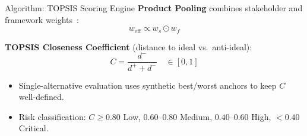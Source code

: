 
\begin{frame}{Algorithm: TOPSIS Scoring Engine}
    \textbf{Product Pooling} combines stakeholder and framework weights~\cite{hwang1981multiple, behzadian2012topsis}:
    \[
        w_{\text{eff}} \propto w_s \odot w_f
    \]

    \textbf{TOPSIS Closeness Coefficient} (distance to ideal vs.\ anti-ideal):
    \[
        C = \frac{d^-}{d^+ + d^-} \quad \in [0, 1]
    \]

    \vspace{6pt}
    \begin{itemize}
        \item Single-alternative evaluation uses synthetic best/worst anchors to keep $C$ well-defined.
        \item Risk classification: $C \geq 0.80$ Low, $0.60$--$0.80$ Medium, $0.40$--$0.60$ High, $< 0.40$ Critical.
    \end{itemize}
\end{frame}

